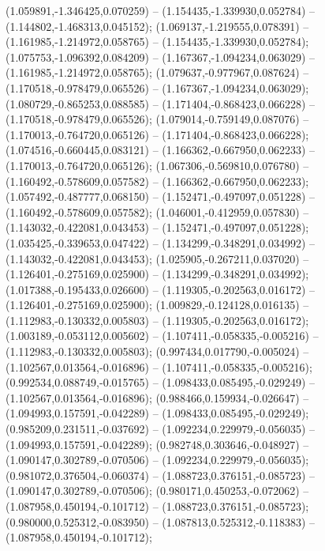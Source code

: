  (1.059891,-1.346425,0.070259) -- (1.154435,-1.339930,0.052784) -- (1.144802,-1.468313,0.045152);
 (1.069137,-1.219555,0.078391) -- (1.161985,-1.214972,0.058765) -- (1.154435,-1.339930,0.052784);
 (1.075753,-1.096392,0.084209) -- (1.167367,-1.094234,0.063029) -- (1.161985,-1.214972,0.058765);
 (1.079637,-0.977967,0.087624) -- (1.170518,-0.978479,0.065526) -- (1.167367,-1.094234,0.063029);
 (1.080729,-0.865253,0.088585) -- (1.171404,-0.868423,0.066228) -- (1.170518,-0.978479,0.065526);
 (1.079014,-0.759149,0.087076) -- (1.170013,-0.764720,0.065126) -- (1.171404,-0.868423,0.066228);
 (1.074516,-0.660445,0.083121) -- (1.166362,-0.667950,0.062233) -- (1.170013,-0.764720,0.065126);
 (1.067306,-0.569810,0.076780) -- (1.160492,-0.578609,0.057582) -- (1.166362,-0.667950,0.062233);
 (1.057492,-0.487777,0.068150) -- (1.152471,-0.497097,0.051228) -- (1.160492,-0.578609,0.057582);
 (1.046001,-0.412959,0.057830) -- (1.143032,-0.422081,0.043453) -- (1.152471,-0.497097,0.051228);
 (1.035425,-0.339653,0.047422) -- (1.134299,-0.348291,0.034992) -- (1.143032,-0.422081,0.043453);
 (1.025905,-0.267211,0.037020) -- (1.126401,-0.275169,0.025900) -- (1.134299,-0.348291,0.034992);
 (1.017388,-0.195433,0.026600) -- (1.119305,-0.202563,0.016172) -- (1.126401,-0.275169,0.025900);
 (1.009829,-0.124128,0.016135) -- (1.112983,-0.130332,0.005803) -- (1.119305,-0.202563,0.016172);
 (1.003189,-0.053112,0.005602) -- (1.107411,-0.058335,-0.005216) -- (1.112983,-0.130332,0.005803);
 (0.997434,0.017790,-0.005024) -- (1.102567,0.013564,-0.016896) -- (1.107411,-0.058335,-0.005216);
 (0.992534,0.088749,-0.015765) -- (1.098433,0.085495,-0.029249) -- (1.102567,0.013564,-0.016896);
 (0.988466,0.159934,-0.026647) -- (1.094993,0.157591,-0.042289) -- (1.098433,0.085495,-0.029249);
 (0.985209,0.231511,-0.037692) -- (1.092234,0.229979,-0.056035) -- (1.094993,0.157591,-0.042289);
 (0.982748,0.303646,-0.048927) -- (1.090147,0.302789,-0.070506) -- (1.092234,0.229979,-0.056035);
 (0.981072,0.376504,-0.060374) -- (1.088723,0.376151,-0.085723) -- (1.090147,0.302789,-0.070506);
 (0.980171,0.450253,-0.072062) -- (1.087958,0.450194,-0.101712) -- (1.088723,0.376151,-0.085723);
 (0.980000,0.525312,-0.083950) -- (1.087813,0.525312,-0.118383) -- (1.087958,0.450194,-0.101712);
